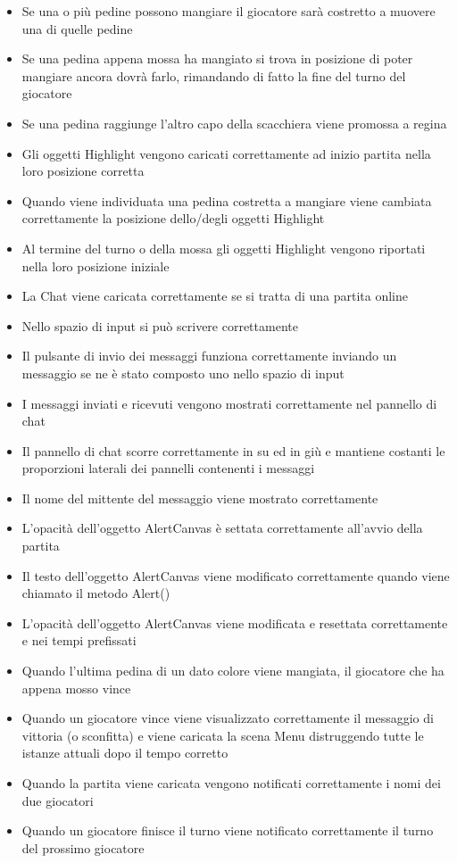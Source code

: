 \documentclass[12pt]{article}
\begin{document}
\begin{itemize}
\item Se una o più pedine possono mangiare il giocatore sarà costretto a muovere una di quelle pedine
\item Se una pedina appena mossa ha mangiato si trova in posizione di poter mangiare ancora dovrà farlo, rimandando di fatto la fine del turno del giocatore
\item Se una pedina raggiunge l'altro capo della scacchiera viene promossa a regina
\item Gli oggetti Highlight vengono caricati correttamente ad inizio partita nella loro posizione corretta
\item Quando viene individuata una pedina costretta a mangiare viene cambiata correttamente la posizione dello/degli oggetti Highlight
\item Al termine del turno o della mossa gli oggetti Highlight vengono riportati nella loro posizione iniziale
\item La Chat viene caricata correttamente se si tratta di una partita online
\item Nello spazio di input si può scrivere correttamente
\item Il pulsante di invio dei messaggi funziona correttamente inviando un messaggio se ne è stato composto uno nello spazio di input
\item I messaggi inviati e ricevuti vengono mostrati correttamente nel pannello di chat
\item Il pannello di chat scorre correttamente in su ed in giù e mantiene costanti le proporzioni laterali dei pannelli contenenti i messaggi
\item Il nome  del mittente del messaggio viene mostrato correttamente
\item L'opacità dell'oggetto AlertCanvas è settata correttamente all'avvio della partita
\item Il testo dell'oggetto AlertCanvas viene modificato correttamente quando viene chiamato il metodo Alert()
\item L'opacità dell'oggetto AlertCanvas viene modificata e resettata correttamente e nei tempi prefissati
\item Quando l'ultima pedina di un dato colore viene mangiata, il giocatore che ha appena mosso vince
\item Quando un giocatore vince viene visualizzato correttamente il messaggio di vittoria (o sconfitta) e viene caricata la scena Menu distruggendo tutte le istanze attuali dopo il tempo corretto
\item Quando la partita viene caricata vengono notificati correttamente i nomi dei due giocatori
\item Quando un giocatore finisce il turno viene notificato correttamente il turno del prossimo giocatore
\end{itemize}
\end{document}
